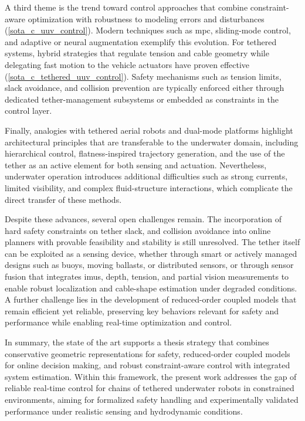 A third theme is the trend toward control approaches that combine constraint-aware optimization
with robustness to modeling errors and disturbances (\cref{sota_c_uuv_control}). Modern techniques
such as \ac{mpc}, sliding-mode control, and adaptive or neural augmentation exemplify this
evolution. For tethered systems, hybrid strategies that regulate tension and cable geometry while
delegating fast motion to the vehicle actuators have proven effective
(\cref{sota_c_tethered_uuv_control}). Safety mechanisms such as tension limits, slack avoidance,
and collision prevention are typically enforced either through dedicated tether-management
subsystems or embedded as constraints in the control layer.

Finally, analogies with tethered aerial robots and dual-mode platforms highlight architectural
principles that are transferable to the underwater domain, including hierarchical control,
flatness-inspired trajectory generation, and the use of the tether as an active element for both
sensing and actuation. Nevertheless, underwater operation introduces additional difficulties such
as strong currents, limited visibility, and complex fluid-structure interactions, which complicate
the direct transfer of these methods.

Despite these advances, several open challenges remain. The incorporation of hard safety
constraints on tether slack, and collision avoidance into online planners with provable feasibility
and stability is still unresolved. The tether itself can be exploited as a sensing device, whether
through smart or actively managed designs such as buoys, moving ballasts, or distributed sensors,
or through sensor fusion that integrates \acp{imu}, depth, tension, and partial vision measurements
to enable robust localization and cable-shape estimation under degraded conditions. A further
challenge lies in the development of reduced-order coupled models that remain efficient yet
reliable, preserving key behaviors relevant for safety and performance while enabling real-time
optimization and control.

In summary, the state of the art supports a thesis strategy that combines conservative geometric
representations for safety, reduced-order coupled models for online decision making, and robust
constraint-aware control with integrated system estimation. Within this framework, the present work
addresses the gap of reliable real-time control for chains of tethered underwater robots in
constrained environments, aiming for formalized safety handling and experimentally validated
performance under realistic sensing and hydrodynamic conditions.

